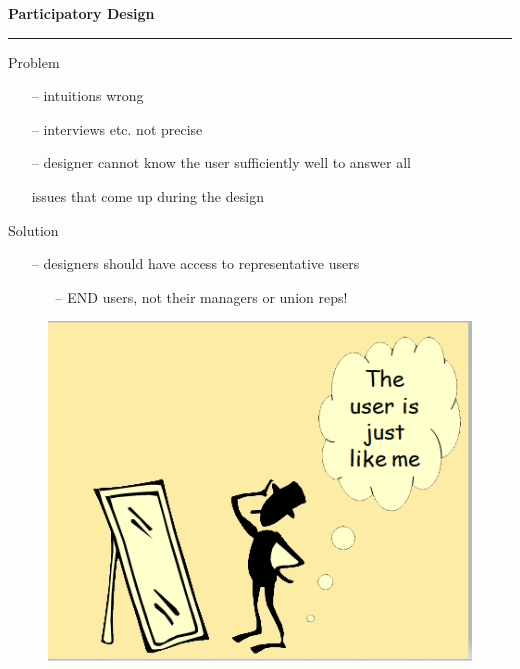 \documentclass[pdf]{beamer}
\begin{document}
\begin{frame}
\vspace{8mm}
\textcolor{myBlue}{\textbf{\Large{Participatory Design}}}

\textcolor{red}{\rule{10cm}{1mm}}

{\LARGE Problem \LARGE}

\begin{itemize}
    \item[\textcolor{black}{--}] intuitions wrong
    \item[\textcolor{black}{--}] interviews etc. not precise
    \item[\textcolor{black}{--}] designer cannot know the user sufficiently well to answer all \par issues that come up during the design
\end{itemize}

{\LARGE Solution  \LARGE}
\begin{itemize}
    \item[\textcolor{black}{--}] designers should have access to representative users
    \begin{itemize}
	\item[--] END users, not their managers or union reps!

    \end{itemize}
\end{itemize}

\begin{figure}[b]
    	\begin{flushright}
    	\includegraphics[scale = 0.3]{moro4.PNG}
        \end{flushright}
        \end{figure}
\end{frame}
\end{document}
